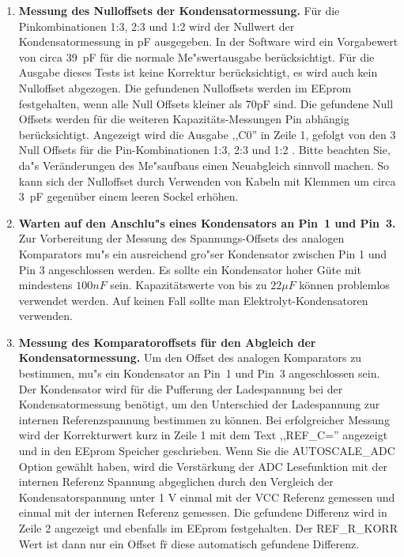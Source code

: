 \begin{enumerate}
\item {\bf Messung des Nulloffsets der Kondensatormessung.}
F\"ur die Pinkombinationen 1:3, 2:3 und 1:2 wird der Nullwert der Kondensatormessung in pF ausgegeben.
In der Software wird ein Vorgabewert von circa 39~pF f\"ur die normale Me"swertausgabe ber\"ucksichtigt.
F\"ur die Ausgabe dieses Tests ist keine Korrektur ber\"ucksichtigt, es wird auch kein Nulloffset abgezogen.
Die gefundenen Nulloffsets werden im EEprom festgehalten, wenn alle Null Offsets kleiner als 70pF sind.
Die gefundene Null Offsets werden f\"ur die weiteren Kapazit\"ats-Messungen Pin abh\"angig ber\"ucksichtigt.
Angezeigt wird  die Ausgabe ,,C0''  in Zeile 1, gefolgt von den 3 Null Offsets f\"ur
die Pin-Kombinationen 1:3, 2:3 und 1:2 .
Bitte beachten Sie, da"s Ver\"anderungen des Me"saufbaus einen Neuabgleich sinnvoll machen.
So kann sich der Nulloffset durch Verwenden von Kabeln mit Klemmen um circa 3~pF gegen\"uber einem leeren
Sockel erh\"ohen.

\item {\bf Warten auf den Anschlu"s eines Kondensators an Pin~1 und Pin~3.}
Zur Vorbereitung der Messung des Spannungs-Offsets des analogen Komparators mu"s ein ausreichend gro"ser
Kondensator zwischen Pin 1 und Pin 3 angeschlossen werden.
 Es sollte ein Kondensator hoher G\"ute mit
mindestens \(100 nF\) sein. Kapazit\"atswerte von bis zu \(22 \mu F\) k\"onnen problemlos verwendet werden.
Auf keinen Fall sollte man Elektrolyt-Kondensatoren verwenden.


\item {\bf Messung des Komparatoroffsets f\"ur den Abgleich der Kondensatormessung.}
Um den Offset des analogen Komparators zu bestimmen, mu"s ein Kondensator an Pin~1 und Pin~3 angeschlossen sein.
Der Kondensator wird f\"ur die Pufferung der Ladespannung bei der Kondensatormessung ben\"otigt, um den Unterschied der 
Ladespannung zur internen Referenzspannung bestimmen zu k\"onnen.
Bei erfolgreicher Messung wird der Korrekturwert kurz in Zeile 1 mit dem Text ,,REF\_C='' angezeigt und in den EEprom Speicher geschrieben.
Wenn Sie die AUTOSCALE\_ADC Option gew\"ahlt haben, wird die Verst\"arkung der ADC Lesefunktion mit der
internen Referenz Spannung abgeglichen durch den Vergleich der Kondensatorspannung unter 1 V einmal mit
der VCC Referenz gemessen und einmal mit der internen Referenz gemessen.
Die gefundene Differenz wird in Zeile 2 angezeigt und ebenfalls im EEprom festgehalten.
Der REF\_R\_KORR Wert ist dann nur ein Offset f\"r diese automatisch gefundene Differenz.

\end{enumerate}


